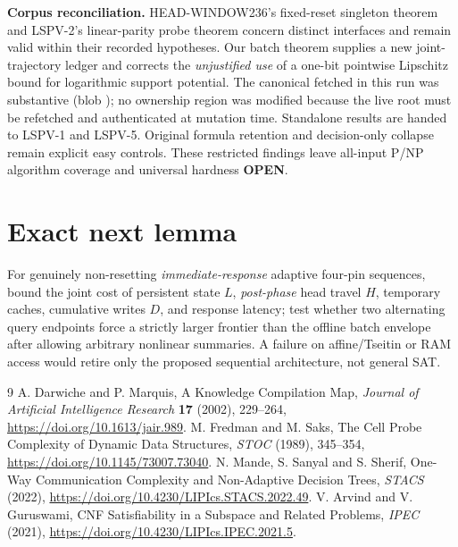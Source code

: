 \documentclass[10pt]{article}
\begin{document}
\noindent\textbf{Corpus reconciliation.} HEAD-WINDOW236's fixed-reset singleton theorem and LSPV-2's linear-parity probe theorem concern distinct interfaces and remain valid within their recorded hypotheses. Our batch theorem supplies a new joint-trajectory ledger and corrects the \emph{unjustified use} of a one-bit pointwise Lipschitz bound for logarithmic support potential. The canonical  fetched in this run was substantive (blob ); no ownership region was modified because the live root must be refetched and authenticated at mutation time. Standalone results are handed to LSPV-1 and LSPV-5. Original formula retention and decision-only collapse remain explicit easy controls. These restricted findings leave all-input P/NP algorithm coverage and universal hardness \textbf{OPEN}.

\section{Exact next lemma}
For genuinely non-resetting \emph{immediate-response} adaptive four-pin sequences, bound the joint cost of persistent state $L$, \emph{post-phase} head travel $H$, temporary caches, cumulative writes $D$, and response latency; test whether two alternating query endpoints force a strictly larger frontier than the offline batch envelope after allowing arbitrary nonlinear summaries. A failure on affine/Tseitin or RAM access would retire only the proposed sequential architecture, not general SAT.

\begin{thebibliography}{9}
 A. Darwiche and P. Marquis, A Knowledge Compilation Map, \emph{Journal of Artificial Intelligence Research} \textbf{17} (2002), 229--264, \url{https://doi.org/10.1613/jair.989}.
 M. Fredman and M. Saks, The Cell Probe Complexity of Dynamic Data Structures, \emph{STOC} (1989), 345--354, \url{https://doi.org/10.1145/73007.73040}.
 N. Mande, S. Sanyal and S. Sherif, One-Way Communication Complexity and Non-Adaptive Decision Trees, \emph{STACS} (2022), \url{https://doi.org/10.4230/LIPIcs.STACS.2022.49}.
 V. Arvind and V. Guruswami, CNF Satisfiability in a Subspace and Related Problems, \emph{IPEC} (2021), \url{https://doi.org/10.4230/LIPIcs.IPEC.2021.5}.
\end{thebibliography}
\end{document}
